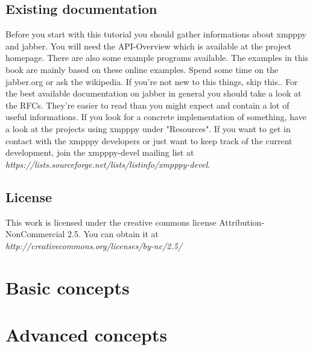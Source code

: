 \documentclass[a4paper,10pt]{report}
\begin{document}
\section{Existing documentation}
Before you start with this tutorial you should gather informations about xmpppy and jabber.
You will need the API-Overview which is available at the project homepage. There are also some example programs available. The examples in this book are mainly based on these online examples.
\newline
\newline
Spend some time on the jabber.org or ask the wikipedia. If you're not new to this things, skip this..
\newline
\newline
For the best available documentation on jabber in general you should take a look at the RFCs. They're easier to read than you might expect and contain a lot of useful informations.
\newline
\newline
If you look for a concrete implementation of something, have a look at the projects using xmpppy under "Resources".
\newline
\newline
If you want to get in contact with the xmpppy developers or just want to keep track of the current development, join the xmpppy-devel mailing list at \textit{https://lists.sourceforge.net/lists/listinfo/xmpppy-devel}.

\section{License}

This work is licensed under the creative commons license Attribution-NonCommercial 2.5.
You can obtain it at \textit{http://creativecommons.org/licenses/by-nc/2.5/}





\chapter{Basic concepts}






\chapter{Advanced concepts}





\newpage
\end{document}
